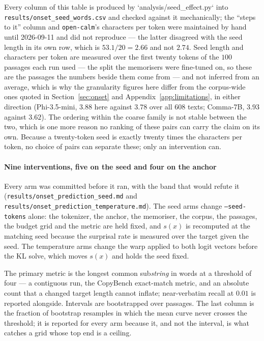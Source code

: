 Every column of this table is produced by `analysis/seed\_effect.py` into
\texttt{results/onset\_seed\_words.csv} and checked against it mechanically; the ``steps to it''
column and \texttt{open-calm}'s characters per token were maintained by hand until 2026-09-11 and
did not reproduce --- the latter disagreed with the seed length in its own row, which is $53.1/20 =
2.66$ and not $2.74$. Seed length and characters per token are measured over the first twenty tokens
of the $100$ passages each run used --- the split the memorisers were fine-tuned on, so these are the passages
the numbers beside them come from --- and not inferred from an average, which is why the granularity
figures here differ from the corpus-wide ones quoted in Section~\ref{sec:onset} and
Appendix~\ref{app:limitations}, in either direction (Phi-3.5-mini, $3.88$ here against $3.78$ over
all $608$ texts; Comma-7B, $3.93$ against $3.62$). The ordering within the coarse family is not stable between
the two, which is one more reason no ranking of these pairs can carry the claim on its own. Because a
twenty-token seed is exactly twenty times the characters per token, no choice of pairs can separate
these; only an intervention can.

\paragraph{Nine interventions, five on the seed and four on the anchor}
Every arm was committed before it ran, with the band that would refute it
(\texttt{results/onset\_prediction\_seed.md} and
\texttt{results/onset\_prediction\_temperature.md}). The seed arms change
\texttt{--seed-tokens} alone: the tokenizer, the anchor, the memoriser, the corpus, the passages,
the budget grid and the metric are held fixed, and $s(x)$ is recomputed at the matching seed because
the surprisal rate is measured over the target given the seed. The temperature arms change the warp
applied to both logit vectors before the KL solve, which moves $s(x)$ and holds the seed fixed.

The primary metric is the longest common sub\emph{string} in words at a threshold of four --- a
contiguous run, the CopyBench exact-match metric, and an absolute
count that a changed target length cannot inflate; near-verbatim recall at $0.01$ is reported
alongside. Intervals are bootstrapped over passages. The last column is the fraction of bootstrap
resamples in which the mean curve never crosses the threshold; it is reported for every arm because
it, and not the interval, is what catches a grid whose top end is a ceiling.

